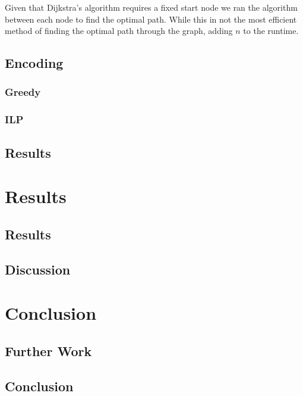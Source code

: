 \documentclass[bsc,frontabs,twoside,singlespacing,parskip,deptreport]{infthesis}     %
\begin{document}
Given that Dijkstra's algorithm requires a fixed start node we ran the algorithm between each node to find
the optimal path. While this in not the most efficient method of finding the optimal path through the graph, adding $n$ to
the runtime.

\section{Encoding}
\subsection{Greedy}
\subsection{ILP}
\section{Results}

\chapter{Results}
\section{Results}
\section{Discussion}
\chapter{Conclusion}
\section{Further Work}
\section{Conclusion}


\end{document}
